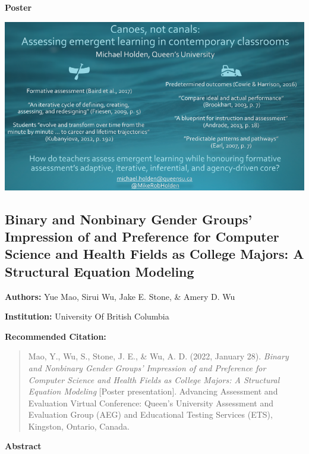 \documentclass[
]{book}
\begin{document}
\textbf{Poster}

\includegraphics{Content/MH.png}

\newpage

\hypertarget{binary-and-nonbinary-gender-groups-impression-of-and-preference-for-computer-science-and-health-fields-as-college-majors-a-structural-equation-modeling}{%
\subsection{Binary and Nonbinary Gender Groups' Impression of and Preference for Computer Science and Health Fields as College Majors: A Structural Equation Modeling}\label{binary-and-nonbinary-gender-groups-impression-of-and-preference-for-computer-science-and-health-fields-as-college-majors-a-structural-equation-modeling}}

\textbf{Authors:} Yue Mao, Sirui Wu, Jake E. Stone, \& Amery D. Wu

\textbf{Institution:} University Of British Columbia

\textbf{Recommended Citation:}

\begin{quote}
Mao, Y., Wu, S., Stone, J. E., \& Wu, A. D. (2022, January 28). \emph{Binary and Nonbinary Gender Groups' Impression of and Preference for Computer Science and Health Fields as College Majors: A Structural Equation Modeling} {[}Poster presentation{]}. Advancing Assessment and Evaluation Virtual Conference: Queen's University Assessment and Evaluation Group (AEG) and Educational Testing Services (ETS), Kingston, Ontario, Canada.
\end{quote}

\textbf{Abstract}
\end{document}
